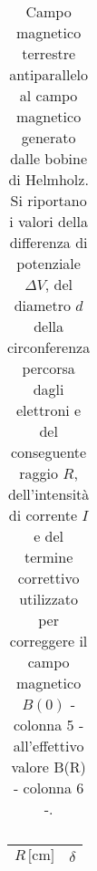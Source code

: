 \documentclass[]{article}
\begin{document}
\begin{table}
\begin{tabular}{||c|c|c|c|c|c|c||}
\end{tabular}
    \caption{Campo magnetico terrestre antiparallelo al campo magnetico generato dalle bobine di Helmholz. Si riportano i valori della differenza di potenziale $\Delta V$, del diametro $ d $ della circonferenza percorsa dagli elettroni e del conseguente raggio $ R $, dell'intensità di corrente $ I $ e del termine correttivo utilizzato per correggere il campo magnetico $B(0)$ - colonna 5 - all'effettivo valore B(R) - colonna 6 -.}
    \label{CM_antiparallelo}
\end{table}


\begin{table}
    \centering

\begin{tabular}{||c|c||}
    \hline
    $R \, \text{[cm]} $ & $ \delta $\\
    \hline\hline


\end{tabular}
\end{table}
\end{document}
